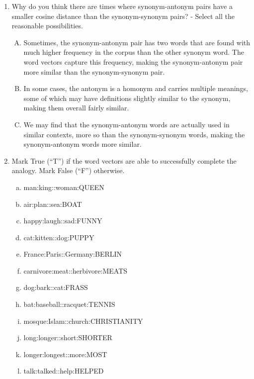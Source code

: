 \begin{enumerate}[1.]
\item {}

Why do you think there are times where synonym-antonym pairs have a smaller cosine distance than the synonym-synonym pairs? - Select all the reasonable possibilities.

\begin{enumerate}[A)]
\item Sometimes, the synonym-antonym pair has two words that are found with much higher frequency in the corpus than the other synonym word. The word vectors capture this frequency, making the synonym-antonym pair more similar than the synonym-synonym pair.

\item In some cases, the antonym is a homonym and carries multiple meanings, some of which may have definitions slightly similar to the synonym, making them overall fairly similar.

\item We may find that the synonym-antonym words are actually used in similar contexts, more so than the synonym-synonym words, making the synonym-antonym words more similar.
\end{enumerate}

\item {}

Mark True (``T'') if the word vectors are able to successfully complete the analogy. Mark False (``F'') otherwise. 

\begin{enumerate}[a.]
\item \textsf{man:king::woman:QUEEN}
\item \textsf{air:plan::sea:BOAT}
\item \textsf{happy:laugh::sad:FUNNY}
\item \textsf{cat:kitten::dog:PUPPY}
\item \textsf{France:Paris::Germany:BERLIN}
\item \textsf{carnivore:meat::herbivore:MEATS}
\item \textsf{dog:bark::cat:FRASS}
\item \textsf{bat:baseball::racquet:TENNIS}
\item \textsf{mosque:Islam::church:CHRISTIANITY}
\item \textsf{long:longer::short:SHORTER}
\item \textsf{longer:longest::more:MOST}
\item \textsf{talk:talked::help:HELPED}
\end{enumerate}


\end{enumerate}
